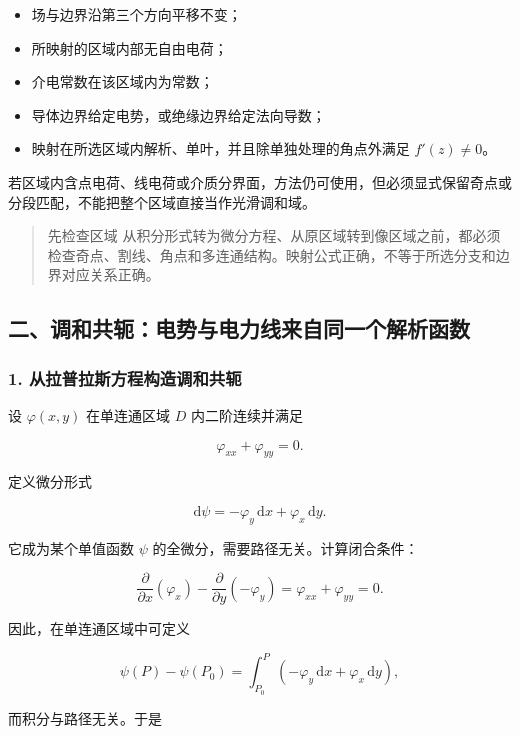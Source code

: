 \begin{itemize}
\tightlist
\item
  场与边界沿第三个方向平移不变；
\item
  所映射的区域内部无自由电荷；
\item
  介电常数在该区域内为常数；
\item
  导体边界给定电势，或绝缘边界给定法向导数；
\item
  映射在所选区域内解析、单叶，并且除单独处理的角点外满足 \(f'(z)\ne0\)。
\end{itemize}

若区域内含点电荷、线电荷或介质分界面，方法仍可使用，但必须显式保留奇点或分段匹配，不能把整个区域直接当作光滑调和域。

\begin{quote}
先检查区域
从积分形式转为微分方程、从原区域转到像区域之前，都必须检查奇点、割线、角点和多连通结构。映射公式正确，不等于所选分支和边界对应关系正确。
\end{quote}

\subsection{二、调和共轭：电势与电力线来自同一个解析函数}\label{m2:ux4e8cux8c03ux548cux5171ux8f6dux7535ux52bfux4e0eux7535ux529bux7ebfux6765ux81eaux540cux4e00ux4e2aux89e3ux6790ux51fdux6570}

\subsubsection{1.
从拉普拉斯方程构造调和共轭}\label{m2:ux4eceux62c9ux666eux62c9ux65afux65b9ux7a0bux6784ux9020ux8c03ux548cux5171ux8f6d}

设 \(\varphi(x,y)\) 在单连通区域 \(D\) 内二阶连续并满足

\[
\varphi_{xx}+\varphi_{yy}=0.
\]

定义微分形式

\[
\mathrm d\psi=-\varphi_y\,\mathrm dx+\varphi_x\,\mathrm dy.
\]

它成为某个单值函数 \(\psi\) 的全微分，需要路径无关。计算闭合条件：

\[
\frac{\partial}{\partial x}(\varphi_x)
-
\frac{\partial}{\partial y}(-\varphi_y)
=
\varphi_{xx}+\varphi_{yy}
=0.
\]

因此，在单连通区域中可定义

\[
\psi(P)-\psi(P_0)
=
\int_{P_0}^{P}
\left(-\varphi_y\,\mathrm dx+\varphi_x\,\mathrm dy\right),
\]

而积分与路径无关。于是

